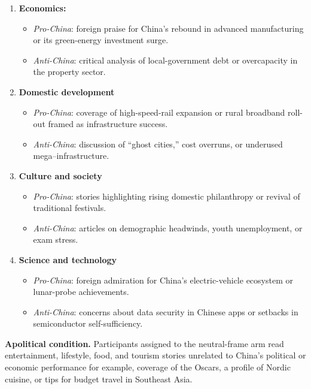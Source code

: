 \documentclass[12pt, american]{article}
\begin{document}
\begin{enumerate}
 
 \item        \textbf{Economics:} 
        \begin{itemize}
            \item \emph{Pro-China}: foreign praise for China’s rebound in advanced manufacturing or its green-energy investment surge.  
            \item \emph{Anti-China}: critical analysis of local-government debt or overcapacity in the property sector.  
        \end{itemize}
        
       
  \item \textbf{Domestic development}
               \begin{itemize}
            \item \emph{Pro-China}: coverage of high-speed-rail expansion or rural broadband roll-out framed as infrastructure success.  
            \item \emph{Anti-China}: discussion of “ghost cities,” cost overruns, or underused mega–infrastructure.
\end{itemize}

  \item \textbf{Culture and society}  
  \begin{itemize}
      \item \emph{Pro-China}: stories highlighting rising domestic philanthropy or revival of traditional festivals.  
       \item \emph{Anti-China}: articles on demographic headwinds, youth unemployment, or exam stress. 
  \end{itemize}
         
       \item \textbf{Science and technology}

  \begin{itemize}
      \item \emph{Pro-China}: foreign admiration for China’s electric-vehicle ecosystem or lunar-probe achievements.  
        \item\emph{Anti-China}: concerns about data security in Chinese apps or setbacks in semiconductor self-sufficiency.  
       \end{itemize}
\end{enumerate}

\textbf{Apolitical condition.}  
Participants assigned to the neutral-frame arm read entertainment, lifestyle, food, and tourism stories unrelated to China’s political or economic performance for example, coverage of the Oscars, a profile of Nordic cuisine, or tips for budget travel in Southeast Asia.
\end{document}
